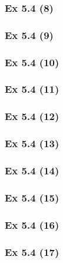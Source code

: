\subsubsection{Ex 5.4 (8)}\label{sec:Ex_5.4.8}

\subsubsection{Ex 5.4 (9)}\label{sec:Ex_5.4.9}

\subsubsection{Ex 5.4 (10)}\label{sec:Ex_5.4.10}

\newpage		%

\subsubsection{Ex 5.4 (11)}\label{sec:Ex_5.4.11}

\subsubsection{Ex 5.4 (12)}\label{sec:Ex_5.4.12}

\subsubsection{Ex 5.4 (13)}\label{sec:Ex_5.4.13}

\subsubsection{Ex 5.4 (14)}\label{sec:Ex_5.4.14}

\subsubsection{Ex 5.4 (15)}\label{sec:Ex_5.4.15}

\subsubsection{Ex 5.4 (16)}\label{sec:Ex_5.4.16}

\subsubsection{Ex 5.4 (17)}\label{sec:Ex_5.4.17}


